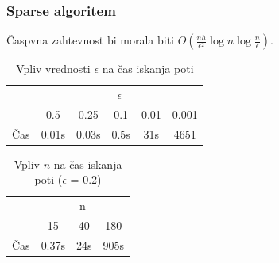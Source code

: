 \documentclass{beamer}
\begin{document}
\begin{frame}
    \frametitle{Sparse algoritem}

    Časpvna zahtevnost bi morala biti $O(\frac{nh}{\epsilon^2} \log n \log \frac{n}{\epsilon})$.

    \begin{table}[h]
        \centering
        \begin{tabular}{|c|c|c|c|c|c|}
            \hline
            & \multicolumn{5}{c|}{$\epsilon$} \\
            \cline{2-6}
            & 0.5 & 0.25 & 0.1 & 0.01 & 0.001 \\
            \hline
            Čas & 0.01s & 0.03s & 0.5s & 31s & 4651 \\
            \hline
        \end{tabular}
        \caption{Vpliv vrednosti $\epsilon$ na čas iskanja poti}
    \end{table}

    \begin{table}[h]
        \centering
        \begin{tabular}{|c|c|c|c|}
            \hline
            & \multicolumn{3}{c|}{n} \\
            \cline{2-4}
            & 15 & 40 & 180 \\
            \hline
            Čas & 0.37s & 24s &  905s \\
            \hline
        \end{tabular}
        \caption{Vpliv $n$ na čas iskanja poti ($\epsilon$ = 0.2)}

    \end{table}

\end{frame}
\end{document}
